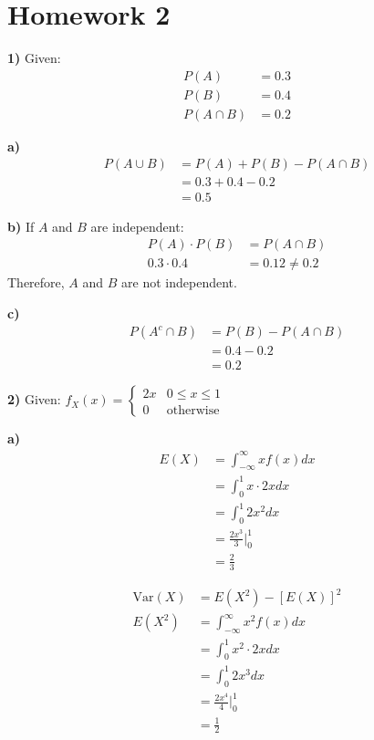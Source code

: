 \documentclass{article}
\begin{document}
\section*{Homework 2}

\textbf{1)} Given:
\begin{align}
P(A) &= 0.3 \\
P(B) &= 0.4 \\
P(A \cap B) &= 0.2
\end{align}

\textbf{a)} 
\begin{align}
P(A \cup B) &= P(A) + P(B) - P(A \cap B) \\
&= 0.3 + 0.4 - 0.2 \\
&= 0.5
\end{align}

\textbf{b)} If $A$ and $B$ are independent:
\begin{align}
P(A) \cdot P(B) &= P(A \cap B) \\
0.3 \cdot 0.4 &= 0.12 \neq 0.2
\end{align}
Therefore, $A$ and $B$ are not independent.

\textbf{c)} 
\begin{align}
P(A^c \cap B) &= P(B) - P(A \cap B) \\
&= 0.4 - 0.2 \\
&= 0.2
\end{align}

\textbf{2)} Given: $f_X(x) = \begin{cases} 2x & 0 \leq x \leq 1 \\ 0 & \text{otherwise} \end{cases}$

\textbf{a)} 
\begin{align}
E(X) &= \int_{-\infty}^{\infty} x f(x) dx \\
&= \int_0^1 x \cdot 2x dx \\
&= \int_0^1 2x^2 dx \\
&= \frac{2x^3}{3}\Big|_0^1 \\
&= \frac{2}{3}
\end{align}

\begin{align}
\text{Var}(X) &= E(X^2) - [E(X)]^2 \\
E(X^2) &= \int_{-\infty}^{\infty} x^2 f(x) dx \\
&= \int_0^1 x^2 \cdot 2x dx \\
&= \int_0^1 2x^3 dx \\
&= \frac{2x^4}{4}\Big|_0^1 \\
&= \frac{1}{2}
\end{align}
\end{document}
